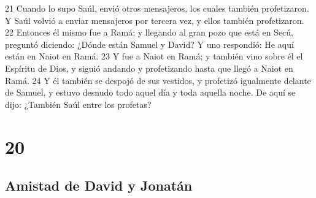 21 Cuando lo supo Saúl, envió otros mensajeros, los cuales también profetizaron. Y Saúl volvió a enviar mensajeros por tercera vez, y ellos también profetizaron.
22 Entonces él mismo fue a Ramá; y llegando al gran pozo que está en Secú, preguntó diciendo: ¿Dónde están Samuel y David? Y uno respondió: He aquí están en Naiot en Ramá.
23 Y fue a Naiot en Ramá; y también vino sobre él el Espíritu de Dios, y siguió andando y profetizando hasta que llegó a Naiot en Ramá.
24 Y él también se despojó de sus vestidos, y profetizó igualmente delante de Samuel, y estuvo desnudo todo aquel día y toda aquella noche. De aquí se dijo: ¿También Saúl entre los profetas? 

\chapter{20}

\section*{Amistad de David y Jonatán}

